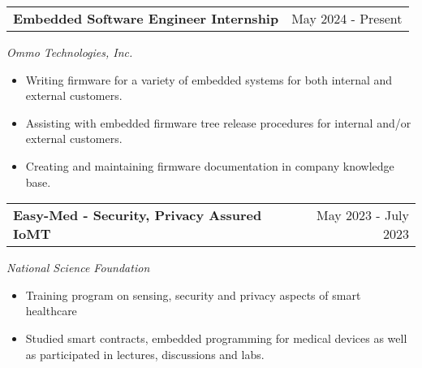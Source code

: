 \documentclass[a4paper,12pt]{article}
\begin{document}
\begin{tabularx}{\linewidth}{@{}Xr@{}}
\textbf{Embedded Software Engineer Internship} & \hfill May 2024 - Present
\end{tabularx}
\textit{Ommo Technologies, Inc.}
\begin{itemize}[leftmargin=*, nosep]
    \item Writing firmware for a variety of embedded systems for both internal and external customers.
    \item Assisting with embedded firmware tree release procedures for internal and/or external customers.
    \item Creating and maintaining firmware documentation in company knowledge base.
\end{itemize}

\begin{tabularx}{\linewidth}{@{}Xr@{}}
\textbf{Easy-Med - Security, Privacy Assured IoMT} & \hfill May 2023 - July 2023
\end{tabularx}
\textit{National Science Foundation}
\begin{itemize}[leftmargin=*, nosep]
    \item Training program on sensing, security and privacy aspects of smart healthcare
    \item Studied smart contracts, embedded programming for medical devices as well as participated in lectures, discussions and labs.
\end{itemize}

\vfill
\end{document}
